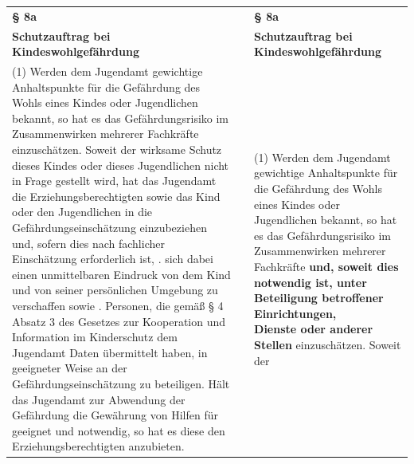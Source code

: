 \documentclass[10pt,a4paper,landscape]{article}
\begin{document}
\begin{longtable}{|L{8.2cm}|L{8.2cm}|L{8.2cm}|}
\hhline{|---|}
\textbf{\S{} 8a} &  & \textbf{\S{} 8a} \\
\hhline{|---|}
\textbf{Schutzauftrag bei Kindeswohlgefährdung} &  & \textbf{Schutzauftrag bei Kindeswohlgefährdung} \\
\hhline{|---|}
(1) Werden dem Jugendamt gewichtige  \newline Anhaltspunkte für die Gefährdung des  \newline Wohls eines Kindes oder Jugendlichen  \newline bekannt, so hat es das Gefährdungsrisiko  \newline im Zusammenwirken mehrerer Fachkräfte  \newline einzuschätzen. Soweit der wirksame  \newline Schutz dieses Kindes oder dieses  \newline Jugendlichen nicht in Frage gestellt wird,  \newline hat das Jugendamt die  \newline Erziehungsberechtigten sowie das Kind  \newline oder den Jugendlichen in die  \newline Gefährdungseinschätzung einzubeziehen  \newline und, sofern dies nach fachlicher  \newline Einschätzung erforderlich ist,   . sich dabei einen unmittelbaren Eindruck  \newline von dem Kind und von seiner persönlichen  \newline Umgebung zu verschaffen sowie   . Personen, die gemäß \S{} 4 Absatz 3 des  \newline Gesetzes zur Kooperation und Information  \newline im Kinderschutz dem Jugendamt Daten  \newline übermittelt haben, in geeigneter Weise an  der Gefährdungseinschätzung zu  \newline beteiligen. Hält das Jugendamt zur  \newline Abwendung der Gefährdung die  \newline Gewährung von Hilfen für geeignet und  \newline notwendig, so hat es diese den  \newline Erziehungsberechtigten anzubieten. &  & (1) Werden dem Jugendamt gewichtige  \newline Anhaltspunkte für die Gefährdung des  \newline Wohls eines Kindes oder Jugendlichen  \newline bekannt, so hat es das Gefährdungsrisiko  \newline im Zusammenwirken mehrerer Fachkräfte  \newline \textbf{\textcolor{diffgreen}{und, soweit dies notwendig ist, unter  \newline Beteiligung betroffener Einrichtungen,  \newline Dienste oder anderer Stellen}}  \newline einzuschätzen. Soweit der 
\end{longtable}
\end{document}
